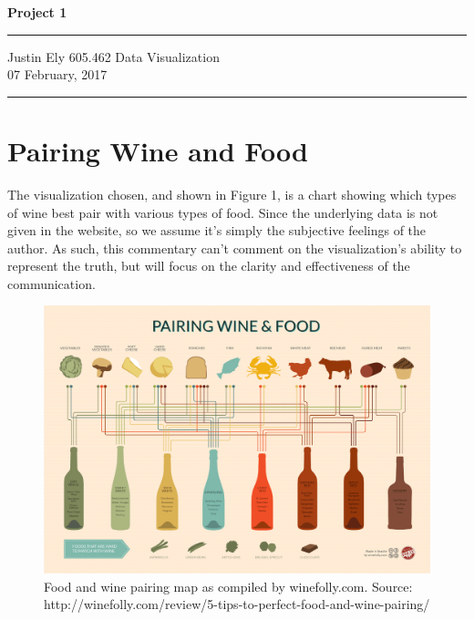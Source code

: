 \documentclass[a4paper,11pt]{article}
\begin{document}
\begin{flushright}

\vspace{1.1cm}

{\bf\Huge Project 1}

\rule{0.25\linewidth}{0.5pt}

\vspace{0.5cm}
Justin Ely
\linebreak
\newline
\footnotesize{605.462 Data Visualization \\}
\vspace{0.5cm}
07 February, 2017
\end{flushright}

\noindent\rule{\linewidth}{1.0pt}


\section{Pairing Wine and Food}
The visualization chosen, and shown in Figure 1, is a chart showing which types of wine best pair with various types of food.  Since the underlying data is not given in the website, so we assume it's simply the subjective feelings of the author.  As such, this commentary can't comment on the visualization's ability to represent the truth, but will focus on the clarity and effectiveness of the communication.  

\begin{figure}[h!]
\caption{Food and wine pairing map as compiled by winefolly.com.  Source: http://winefolly.com/review/5-tips-to-perfect-food-and-wine-pairing/} 
\centering
\includegraphics[width=1.1\textwidth]{wine-and-food-pairing-chart.png}
\end{figure}
\end{document}
